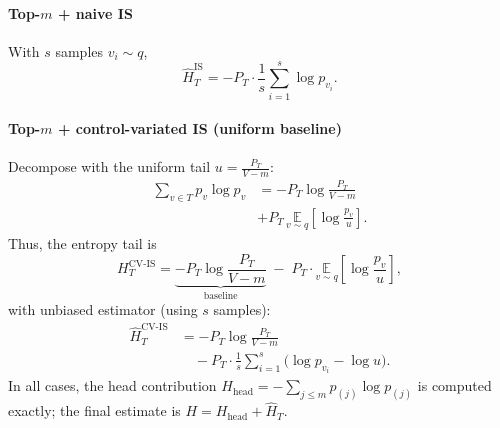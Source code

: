 \documentclass[11pt]{article}
\begin{document}
\paragraph{Top-$m$ + naive IS} With $s$ samples $v_i\!\sim q$,
\[
	\widehat{H}_T^{\text{IS}}
	= -P_T \cdot \frac{1}{s}\sum_{i=1}^s \log p_{v_i}.
\]
\paragraph{Top-$m$ + control-variated IS (uniform baseline)}
Decompose with the uniform tail $u=\tfrac{P_T}{V-m}$:
\begin{align*}
	\sum_{v\in T} p_v \log p_v
	 & = -P_T\log\!\frac{P_T}{V-m}                                              \\
	 & + P_T\,\underset{v\sim q}{\mathbb{E}}\!\left[\log\!\frac{p_v}{u}\right].
\end{align*}
Thus, the entropy tail is
\[
	H_T^{\text{CV-IS}}
	= \underbrace{-P_T\log\!\frac{P_T}{V-m}}_{\text{baseline}}
	\;-\; P_T \cdot \underset{v\sim q}{\mathbb{E}}\!\left[\log\!\frac{p_v}{u}\right],
\]
with unbiased estimator (using $s$ samples):
\begin{align*}
	\widehat{H}_T^{\text{CV-IS}}
	 & = -P_T\log\!\frac{P_T}{V-m}                                                \\
	 & \quad - P_T \cdot \frac{1}{s}\sum_{i=1}^s \Big(\log p_{v_i} - \log u\Big).
\end{align*}
In all cases, the head contribution $H_{\text{head}}=-\sum_{j\le m}p_{(j)}\log p_{(j)}$ is computed exactly; the final estimate is $H=H_{\text{head}}+\widehat{H}_T$.
\end{document}
